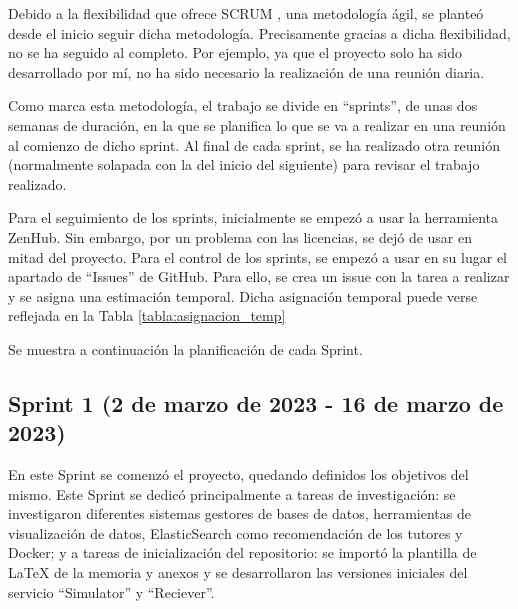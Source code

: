 Debido a la flexibilidad que ofrece SCRUM \cite{schwaber2001agile}, una metodología ágil, se planteó desde el inicio seguir dicha 
metodología. Precisamente gracias a dicha flexibilidad, no se ha seguido al completo. Por ejemplo, ya que 
el proyecto solo ha sido desarrollado por mí, no ha sido necesario la realización de una reunión diaria.

Como marca esta metodología, el trabajo se divide en ``sprints'', de unas dos semanas de duración, en la que 
se planifica lo que se va a realizar en una reunión al comienzo de dicho sprint. Al final de cada sprint, se
ha realizado otra reunión (normalmente solapada con la del inicio del siguiente) para revisar el trabajo realizado.

Para el seguimiento de los sprints, inicialmente se empezó a usar la herramienta ZenHub. Sin embargo, por un problema
con las licencias, se dejó de usar en mitad del proyecto. Para el control de los sprints, se empezó a usar en su 
lugar el apartado de ``Issues'' de GitHub. Para ello, se crea un issue con la tarea a realizar y se asigna una estimación 
temporal. Dicha asignación temporal puede verse reflejada en la Tabla \ref{tabla:asignacion_temp}


Se muestra a continuación la planificación de cada Sprint.

\subsection{Sprint 1 (2 de marzo de 2023 - 16 de marzo de 2023)}

En este Sprint se comenzó el proyecto, quedando definidos los objetivos del mismo. Este Sprint se dedicó principalmente 
a tareas de investigación: se investigaron diferentes sistemas gestores de bases de datos, herramientas de visualización 
de datos, ElasticSearch como recomendación de los tutores y Docker; y a tareas de inicialización del repositorio: se 
importó la plantilla de LaTeX de la memoria y anexos y se desarrollaron las versiones iniciales del servicio ``Simulator'' y 
``Reciever''.


